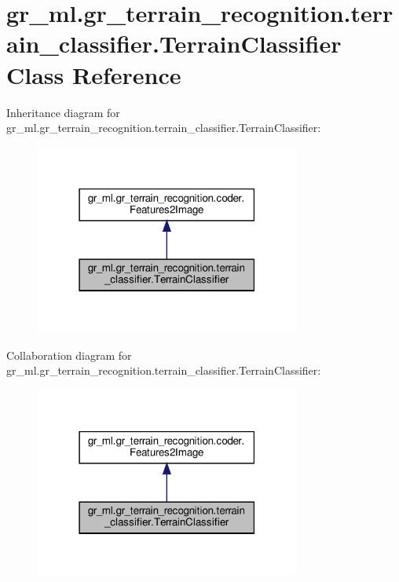 \hypertarget{classgr__ml_1_1gr__terrain__recognition_1_1terrain__classifier_1_1TerrainClassifier}{}\section{gr\+\_\+ml.\+gr\+\_\+terrain\+\_\+recognition.\+terrain\+\_\+classifier.\+Terrain\+Classifier Class Reference}
\label{classgr__ml_1_1gr__terrain__recognition_1_1terrain__classifier_1_1TerrainClassifier}


Inheritance diagram for gr\+\_\+ml.\+gr\+\_\+terrain\+\_\+recognition.\+terrain\+\_\+classifier.\+Terrain\+Classifier\+:
\nopagebreak
\begin{figure}[H]
\begin{center}
\leavevmode
\includegraphics[width=247pt]{classgr__ml_1_1gr__terrain__recognition_1_1terrain__classifier_1_1TerrainClassifier__inherit__graph}
\end{center}
\end{figure}


Collaboration diagram for gr\+\_\+ml.\+gr\+\_\+terrain\+\_\+recognition.\+terrain\+\_\+classifier.\+Terrain\+Classifier\+:
\nopagebreak
\begin{figure}[H]
\begin{center}
\leavevmode
\includegraphics[width=247pt]{classgr__ml_1_1gr__terrain__recognition_1_1terrain__classifier_1_1TerrainClassifier__coll__graph}
\end{center}
\end{figure}
